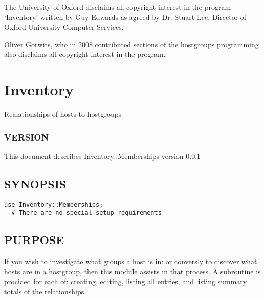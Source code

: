 \documentclass{book}
\begin{document}
The University of Oxford disclaims all copyright interest in the program `Inventory' written by Guy Edwards as agreed by Dr. Stuart Lee, Director of Oxford University Computer Services.



Oliver Gorwits, who in 2008 contributed sections of the hostgroups programming also disclaims all copyright interest in the program.




\section{Inventory}
\label{_Inventory::Memberships}
\hypertarget{_Inventory::Memberships}{}



Realationships of hosts to hostgroups


\subsubsection{VERSION}
\label{Inventory::Memberships_VERSION}
\hypertarget{Inventory::Memberships_VERSION}{}



This document describes Inventory::Memberships version 0.0.1


\subsection{SYNOPSIS}
\label{Inventory::Memberships_SYNOPSIS}
\hypertarget{Inventory::Memberships_SYNOPSIS}{}


\begin{Verbatim}[fontfamily=courier,gobble=1,frame=lines,fontsize=\small]
  use Inventory::Memberships;
  # There are no special setup requirements
\end{Verbatim}


\subsection{PURPOSE}
\label{Inventory::Memberships_PURPOSE}
\hypertarget{Inventory::Memberships_PURPOSE}{}



If you wish to investigate what groups a host is in: or conversly to discover what hosts are in a hostgroup, then this module assists in that process. A subroutine is procided for each of: creating, editing, listing all entries, and listing summary totals of the relationships.
\end{document}
